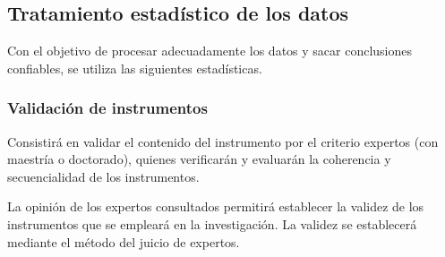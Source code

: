 \documentclass[12pt,a4paper]{article}
\begin{document}
\subsection{Tratamiento estadístico de los datos}
Con el objetivo de procesar adecuadamente los datos y sacar conclusiones confiables, se utiliza  las siguientes estadísticas.

%
%
%

\subsubsection{Validación de instrumentos}
Consistirá en validar el contenido del instrumento por el criterio expertos (con maestría o doctorado), quienes verificarán y evaluarán la coherencia y secuencialidad de los instrumentos.



La opinión de los expertos consultados permitirá establecer la validez de los instrumentos que se empleará en la investigación. La validez se establecerá mediante el método del juicio de expertos.



\end{document}
